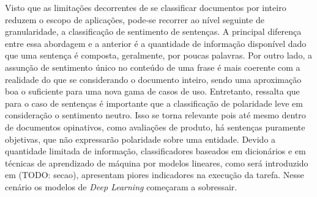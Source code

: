 Visto que as limitações decorrentes de se classificar documentos por inteiro
reduzem o escopo de aplicações, pode-se recorrer ao nível seguinte de
granularidade, a classificação de sentimento de sentenças.
A principal diferença entre essa abordagem e a anterior é a quantidade de
informação disponível dado que uma sentença é composta, geralmente, por poucas
palavras.
Por outro lado, a assunção de sentimento único no conteúdo de uma frase é mais
coerente com a realidade do que se considerando o documento inteiro, sendo uma
aproximação boa o suficiente para uma nova gama de casos de uso.
Entretanto, \citet{liu15} ressalta que para o caso de sentenças é importante que
a classificação de polaridade leve em consideração o sentimento neutro.
Isso se torna relevante pois até mesmo dentro de documentos opinativos, como
avaliações de produto, há sentenças puramente objetivas, que não expressarão
polaridade sobre uma entidade.
Devido a quantidade limitada de informação, classificadores baseados em
dicionários e em técnicas de aprendizado de máquina por modelos lineares,
como será introduzido em (TODO: secao), apresentam piores indicadores na
execução da tarefa.
Nesse cenário os modelos de \textit{Deep Learning} começaram a sobressair.


%

